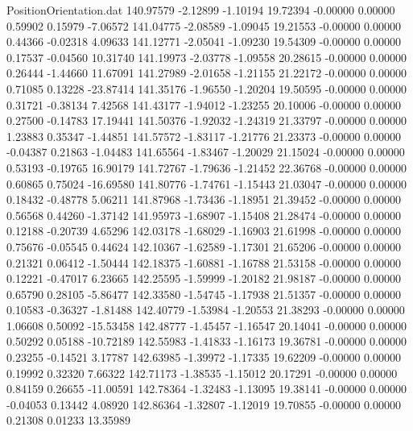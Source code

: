\begin{filecontents}{PositionOrientation.dat}
 140.97579   -2.12899   -1.10194    19.72394   -0.00000    0.00000    0.59902    0.15979   -7.06572
 141.04775   -2.08589   -1.09045    19.21553   -0.00000    0.00000    0.44366   -0.02318    4.09633
 141.12771   -2.05041   -1.09230    19.54309   -0.00000    0.00000    0.17537   -0.04560   10.31740
 141.19973   -2.03778   -1.09558    20.28615   -0.00000    0.00000    0.26444   -1.44660   11.67091
 141.27989   -2.01658   -1.21155    21.22172   -0.00000    0.00000    0.71085    0.13228  -23.87414
 141.35176   -1.96550   -1.20204    19.50595   -0.00000    0.00000    0.31721   -0.38134    7.42568
 141.43177   -1.94012   -1.23255    20.10006   -0.00000    0.00000    0.27500   -0.14783   17.19441
 141.50376   -1.92032   -1.24319    21.33797   -0.00000    0.00000    1.23883    0.35347   -1.44851
 141.57572   -1.83117   -1.21776    21.23373   -0.00000    0.00000   -0.04387    0.21863   -1.04483
 141.65564   -1.83467   -1.20029    21.15024   -0.00000    0.00000    0.53193   -0.19765   16.90179
 141.72767   -1.79636   -1.21452    22.36768   -0.00000    0.00000    0.60865    0.75024  -16.69580
 141.80776   -1.74761   -1.15443    21.03047   -0.00000    0.00000    0.18432   -0.48778    5.06211
 141.87968   -1.73436   -1.18951    21.39452   -0.00000    0.00000    0.56568    0.44260   -1.37142
 141.95973   -1.68907   -1.15408    21.28474   -0.00000    0.00000    0.12188   -0.20739    4.65296
 142.03178   -1.68029   -1.16903    21.61998   -0.00000    0.00000    0.75676   -0.05545    0.44624
 142.10367   -1.62589   -1.17301    21.65206   -0.00000    0.00000    0.21321    0.06412   -1.50444
 142.18375   -1.60881   -1.16788    21.53158   -0.00000    0.00000    0.12221   -0.47017    6.23665
 142.25595   -1.59999   -1.20182    21.98187   -0.00000    0.00000    0.65790    0.28105   -5.86477
 142.33580   -1.54745   -1.17938    21.51357   -0.00000    0.00000    0.10583   -0.36327   -1.81488
 142.40779   -1.53984   -1.20553    21.38293   -0.00000    0.00000    1.06608    0.50092  -15.53458
 142.48777   -1.45457   -1.16547    20.14041   -0.00000    0.00000    0.50292    0.05188  -10.72189
 142.55983   -1.41833   -1.16173    19.36781   -0.00000    0.00000    0.23255   -0.14521    3.17787
 142.63985   -1.39972   -1.17335    19.62209   -0.00000    0.00000    0.19992    0.32320    7.66322
 142.71173   -1.38535   -1.15012    20.17291   -0.00000    0.00000    0.84159    0.26655  -11.00591
 142.78364   -1.32483   -1.13095    19.38141   -0.00000    0.00000   -0.04053    0.13442    4.08920
 142.86364   -1.32807   -1.12019    19.70855   -0.00000    0.00000    0.21308    0.01233   13.35989

\end{filecontents}
